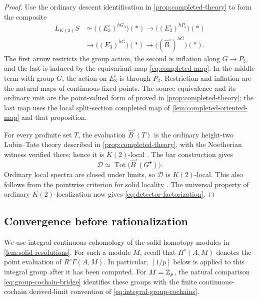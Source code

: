 \begin{proof}
Use the ordinary descent identification in
\cref{prop:completed-theory} to form the composite
\begin{equation}\label{eq:detector-construction}
\begin{split}
 L_{K(3)}S
 &\simeq\bigl((E_3^{\square})^{hG_3}\bigr)(*)
 \longrightarrow\bigl((E_3^{\square})^{hP_3}\bigr)(*)\\
 &\longrightarrow\bigl((E_3^{\square})^{hG}\bigr)(*)
 \longrightarrow\bigl((\widehat B^{\square})^{hG}\bigr)(*).
\end{split}
\end{equation}
The first arrow restricts the group action, the second is inflation along
$G\to P_3$, and the last is induced by the equivariant map
\eqref{eq:completed-map}.  In the middle term with group $G$, the action on
$E_3^{\square}$ is through $P_3$. Restriction and inflation are the
natural maps of continuous fixed points. The source equivalence and its ordinary unit are the point-valued
form of \cite[Proposition~4.6.9]{BMR2026} proved in
\cref{prop:completed-theory}; the last map uses the local split-section
completed map of \cref{lem:completed-oriented-map} and that proposition.

For every profinite set $T$, the evaluation
$\widehat B^{\square}(T)$ is the ordinary height-two Lubin--Tate theory
described in \cref{prop:completed-theory}, with the Noetherian witness
verified there; hence it is $K(2)$-local
\cite[Proposition~4.4.2]{BMR2026}.
The bar construction gives
\[
 \mathcal D\simeq\operatorname{Tot}\bigl(\widehat B^{\square}(G^{\bullet})\bigr).
\]
Ordinary local spectra are closed under limits, so $\mathcal D$ is
$K(2)$-local.  This also follows from the
pointwise criterion for solid locality
\cite[Definition~4.5.7 and the following paragraph]{BMR2026}.
The universal property of ordinary $K(2)$-localization now gives
\eqref{eq:detector-factorization}.
\end{proof}

\subsection{Convergence before rationalization}

We use integral continuous cohomology of the solid homotopy modules in
\cref{lem:solid-resolutions}.  For such a module $M$, recall that
$H^s(A,M)$ denotes the point evaluation of $R^s\Gamma(A,M)$.
In particular, $[1/p]$ below is applied to this integral group after it
has been computed.  For $M=\mathbb Z_p$, the natural comparison
\eqref{eq:group-cochain-bridge} identifies these groups with the
finite continuous-cochain derived-limit convention of
\eqref{eq:integral-group-cochains}.

